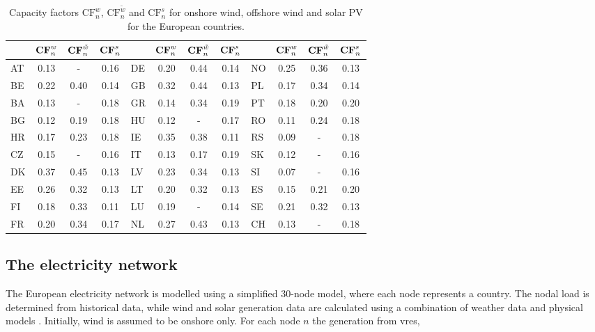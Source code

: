 \documentclass[a4paper, 5p, sort&compress]{elsarticle}%
\begin{document}
\begin{table}[t!]
  \caption{Capacity factors $\text{CF}_n^w$, $\text{CF}_n^{\tilde{w}}$ and  $\text{CF}_n^s$ for onshore wind, offshore wind and solar PV for the European countries.}
  \label{tab:capacity-factors}
  \begin{adjustbox}{center}
    \begin{tabular}{lccclccclccc}  \toprule
      & $\text{\textbf{CF}}_n^w$ & $\text{\textbf{CF}}_n^{\tilde{w}}$ & $\text{\textbf{CF}}_n^s$ &  & $\text{\textbf{CF}}_n^w$ &
      $\text{\textbf{CF}}_n^{\tilde{w}}$ & $\text{\textbf{CF}}_n^s$ &  & $\text{\textbf{CF}}_n^w$ & $\text{\textbf{CF}}_n^{\tilde{w}}$ &
      $\text{\textbf{CF}}_n^s$\\ \midrule
      AT & 0.13 & - & 0.16 & DE & 0.20 & 0.44 & 0.14 & NO & 0.25 & 0.36 & 0.13\\
      BE & 0.22 & 0.40 & 0.14 & GB & 0.32 & 0.44 & 0.13 & PL & 0.17 & 0.34 & 0.14\\
      BA & 0.13 & - & 0.18 & GR & 0.14 & 0.34 & 0.19 & PT & 0.18 & 0.20 & 0.20\\
      BG & 0.12 & 0.19 & 0.18 & HU & 0.12 & - & 0.17 & RO & 0.11 & 0.24 & 0.18\\
      HR & 0.17 & 0.23 & 0.18 & IE & 0.35 & 0.38 & 0.11 & RS & 0.09 & - & 0.18\\
      CZ & 0.15 & - & 0.16 & IT & 0.13 & 0.17 & 0.19 & SK & 0.12 & - & 0.16\\
      DK & 0.37 & 0.45 & 0.13 & LV & 0.23 & 0.34 & 0.13 & SI & 0.07 & - & 0.16\\
      EE & 0.26 & 0.32 & 0.13 & LT & 0.20 & 0.32 & 0.13 & ES & 0.15 & 0.21 & 0.20\\
      FI & 0.18 & 0.33 & 0.11 & LU & 0.19 & - & 0.14 & SE & 0.21 & 0.32 & 0.13\\
      FR & 0.20 & 0.34 & 0.17 & NL & 0.27 & 0.43 & 0.13 & CH & 0.13 & - & 0.18\\ \bottomrule
    \end{tabular}
  \end{adjustbox}
\end{table}


\subsection{The electricity network}

The European electricity network is modelled using a simplified
30-node model, where each node represents a country. The nodal load is
determined from historical data, while wind and solar generation data
are calculated using a combination of weather data and physical models
\cite{REA}. Initially, wind is assumed to be onshore only. For each
node $n$ the generation from \gls{vres},
\end{document}

